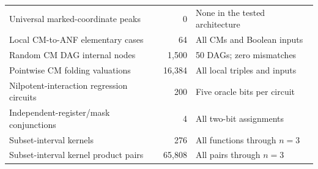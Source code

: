 \begin{longtable}{@{}L{0.48\textwidth}rL{0.31\textwidth}@{}}
Universal marked-coordinate peaks & 0 & None in the tested architecture\\
Local CM-to-ANF elementary cases & 64 & All CMs and Boolean inputs\\
Random CM DAG internal nodes & 1,500 & 50 DAGs; zero mismatches\\
Pointwise CM folding valuations & 16,384 & All local triples and inputs\\
Nilpotent-interaction regression circuits & 200 & Five oracle bits per circuit\\
Independent-register/mask conjunctions & 4 & All two-bit assignments\\
Subset-interval kernels & 276 & All functions through $n=3$\\
Subset-interval kernel product pairs & 65,808 & All pairs through $n=3$\\
\bottomrule\end{longtable}
